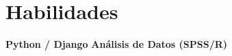 \documentclass[letterpaper,11pt]{article}
\begin{document}
\section{Habilidades}
\noindent
    \textbf{Python / Django} 
     \quad \textbullet \quad     \textbf{Análisis de Datos (SPSS/R)} 
    
\end{document}
